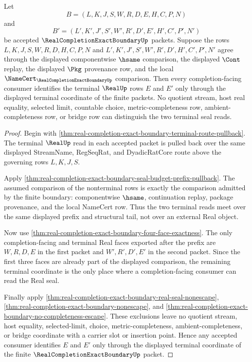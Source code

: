 \begin{theorem}
\label{thm:real-completion-exact-boundary-terminal-seal-determinacy}
Let
$$
B=(L,K,J,S,W,R,D,E,H,C,P,N)
$$
and
$$
B'=(L',K',J',S',W',R',D',E',H',C',P',N')
$$
be accepted $\RealCompletionExactBoundaryUp$ packets. Suppose the rows $L,K,J,S,W,R,D,H,C,P,N$ and $L',K',J',S',W',R',D',H',C',P',N'$ agree through the displayed componentwise $\hsame$ comparison, the displayed $\Cont$ replay, the displayed $\Pkg$ provenance row, and the local $\NameCert_{\RealCompletionExactBoundaryUp}$ comparison. Then every completion-facing consumer identifies the terminal $\RealUp$ rows $E$ and $E'$ only through the displayed terminal coordinate of the finite packets. No quotient stream, host real equality, selected limit, countable choice, metric-completeness row, ambient-completeness row, or bridge row can distinguish the two terminal seal reads.
\end{theorem}
\begin{proof}
Begin with \autoref{thm:real-completion-exact-boundary-terminal-route-pullback}. The terminal $\RealUp$ read in each accepted packet is pulled back over the same displayed StreamName, RegSeqRat, and DyadicRatCore route above the governing rows $L,K,J,S$.

Apply \autoref{thm:real-completion-exact-boundary-seal-budget-prefix-pullback}. The assumed comparison of the nonterminal rows is exactly the comparison admitted by the finite boundary: componentwise $\hsame$, continuation replay, package provenance, and the local NameCert row. Thus the two terminal reads meet over the same displayed prefix and structural tail, not over an external Real object.

Now use \autoref{thm:real-completion-exact-boundary-four-face-exactness}. The only completion-facing and terminal Real faces exported after the prefix are $W,R,D,E$ in the first packet and $W',R',D',E'$ in the second packet. Since the first three faces are already part of the displayed comparison, the remaining terminal coordinate is the only place where a completion-facing consumer can read the Real seal.

Finally apply \autoref{thm:real-completion-exact-boundary-real-seal-nonescape}, \autoref{thm:real-completion-exact-boundary-nonescape}, and \autoref{thm:real-completion-exact-boundary-no-completeness-escape}. These exclusions leave no quotient stream, host equality, selected-limit, choice, metric-completeness, ambient-completeness, or bridge coordinate with a carrier slot or insertion point. Hence any accepted consumer identifies $E$ and $E'$ only through the displayed terminal coordinate of the finite $\RealCompletionExactBoundaryUp$ packet.
\end{proof}

